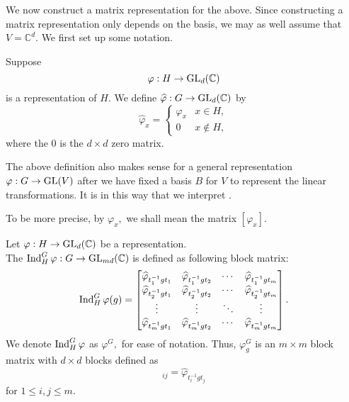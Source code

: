 
We now construct a matrix representation for the above. Since constructing a matrix representation only depends on the basis, we may as well assume that $V = \mathbb{C}^d.$ We first set up some notation.

\begin{defn}
	Suppose
	\begin{equation*} 
		\varphi : H \to \operatorname{GL}_d(\mathbb{C})
	\end{equation*}
	is a representation of $H.$ We define $\widehat{\varphi} : G \to \operatorname{GL}_d(\mathbb{C})$ by
	\begin{equation*} 
		\widehat{\varphi}_x = \begin{cases}
			\varphi_x & x \in H,\\
			0 & x \notin H,
		\end{cases}
	\end{equation*}
	where the $0$ is the $d \times d$ zero matrix. 
\end{defn}

\begin{rem}
	The above definition also makes sense for a general representation $\varphi : G \to \operatorname{GL}(V)$ after we have fixed a basis $B$ for $V$ to represent the linear transformations. It is in this way that we interpret .

	To be more precise, by $\varphi_x,$ we shall mean the matrix $[\varphi_x].$
\end{rem}

\begin{defn}%
	\label{defn:inducedrep1}
	Let $\varphi : H \to \operatorname{GL}_d(\mathbb{C})$ be a representation.\\
	The  $\operatorname{Ind}^{G}_{H}\varphi : G \to \operatorname{GL}_{md}(\mathbb{C})$ is defined as following block matrix:
	\begin{equation} \label{eq:inducedrepmatrix}
		\operatorname{Ind}^{G}_{H}\varphi(g) = \begin{bmatrix}
			\widehat{\varphi}_{t_1^{-1}gt_1} & \widehat{\varphi}_{t_1^{-1}gt_2} & \cdots & \widehat{\varphi}_{t_1^{-1}gt_m}\\
			\widehat{\varphi}_{t_2^{-1}gt_1} & \widehat{\varphi}_{t_2^{-1}gt_2} & \cdots & \widehat{\varphi}_{t_2^{-1}gt_m}\\
			\vdots & \vdots & \ddots & \vdots\\
			\widehat{\varphi}_{t_m^{-1}gt_1} & \widehat{\varphi}_{t_m^{-1}gt_2} & \cdots & \widehat{\varphi}_{t_m^{-1}gt_m}\\
		\end{bmatrix}.
	\end{equation}
	We denote $\operatorname{Ind}^{G}_{H}\varphi$ as $\varphi^G,$ for ease of notation. Thus, $\varphi^G_g$ is an $m \times m$ block matrix with $d \times d$ blocks defined as
	\begin{equation*} 
		[\varphi^G_g]_{ij} = \widehat{\varphi}_{t_i^{-1}gt_j}
	\end{equation*}
	for $1 \le i, j \le m.$
\end{defn}

